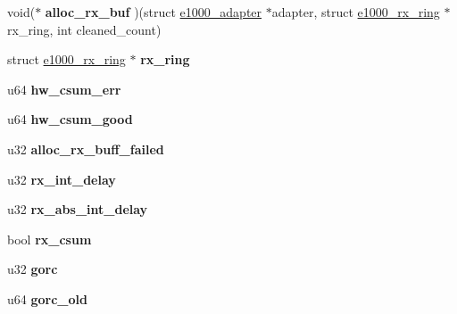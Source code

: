 \begin{DoxyCompactItemize}
\item 
\hypertarget{structe1000__adapter_a853c1d60eadfd5db8058693665a5ad3b}{
void($\ast$ {\bfseries alloc\_\-rx\_\-buf} )(struct \hyperlink{structe1000__adapter}{e1000\_\-adapter} $\ast$adapter, struct \hyperlink{structe1000__rx__ring}{e1000\_\-rx\_\-ring} $\ast$rx\_\-ring, int cleaned\_\-count)}
\label{structe1000__adapter_a853c1d60eadfd5db8058693665a5ad3b}

\item 
\hypertarget{structe1000__adapter_ab29a8f4930262a40fc347f63727e519a}{
struct \hyperlink{structe1000__rx__ring}{e1000\_\-rx\_\-ring} $\ast$ {\bfseries rx\_\-ring}}
\label{structe1000__adapter_ab29a8f4930262a40fc347f63727e519a}

\item 
\hypertarget{structe1000__adapter_a60857fa29b592594a2da7a59df6c6c74}{
u64 {\bfseries hw\_\-csum\_\-err}}
\label{structe1000__adapter_a60857fa29b592594a2da7a59df6c6c74}

\item 
\hypertarget{structe1000__adapter_af4a507c64486f47130303c3018ece2a4}{
u64 {\bfseries hw\_\-csum\_\-good}}
\label{structe1000__adapter_af4a507c64486f47130303c3018ece2a4}

\item 
\hypertarget{structe1000__adapter_a65921ccd793652f64e3003f1552ee660}{
u32 {\bfseries alloc\_\-rx\_\-buff\_\-failed}}
\label{structe1000__adapter_a65921ccd793652f64e3003f1552ee660}

\item 
\hypertarget{structe1000__adapter_a8516c6831520609bd5d62feab89e69ce}{
u32 {\bfseries rx\_\-int\_\-delay}}
\label{structe1000__adapter_a8516c6831520609bd5d62feab89e69ce}

\item 
\hypertarget{structe1000__adapter_a19a29add622475a09fa9d88bfb1dc63f}{
u32 {\bfseries rx\_\-abs\_\-int\_\-delay}}
\label{structe1000__adapter_a19a29add622475a09fa9d88bfb1dc63f}

\item 
\hypertarget{structe1000__adapter_adcb6374720b100c13fba65d084c96bd3}{
bool {\bfseries rx\_\-csum}}
\label{structe1000__adapter_adcb6374720b100c13fba65d084c96bd3}

\item 
\hypertarget{structe1000__adapter_abd3287c46c3b461cbf6d975008334f43}{
u32 {\bfseries gorc}}
\label{structe1000__adapter_abd3287c46c3b461cbf6d975008334f43}

\item 
\hypertarget{structe1000__adapter_aadc5ed86f6ace6303564209d8e0a8bab}{
u64 {\bfseries gorc\_\-old}}
\label{structe1000__adapter_aadc5ed86f6ace6303564209d8e0a8bab}


\end{DoxyCompactItemize}
